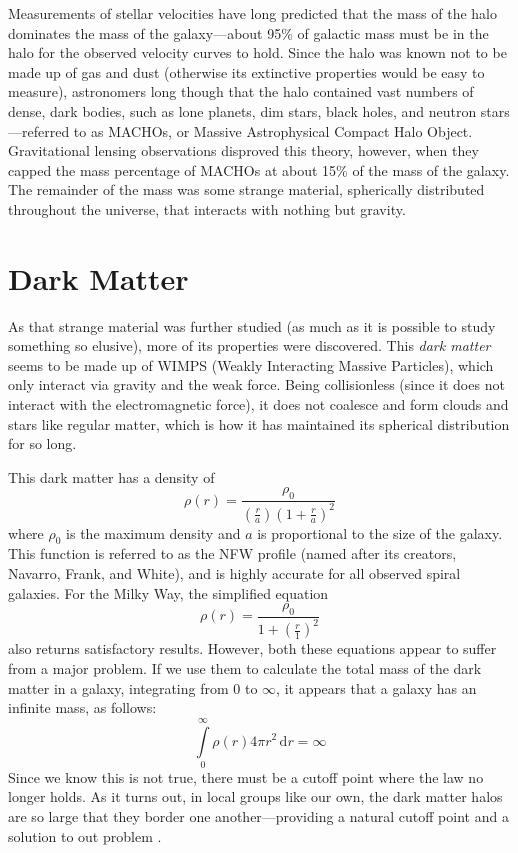 \documentclass[12pt,twoside]{reedthesis}
\begin{document}
Measurements of stellar velocities have long predicted that the mass of the halo dominates the mass of the galaxy---about 95\% of galactic mass must be in the halo for the observed velocity curves to hold. Since the halo was known not to be made up of gas and dust (otherwise its extinctive properties would be easy to measure), astronomers long though that the halo contained vast numbers of dense, dark bodies, such as lone planets, dim stars, black holes, and neutron stars---referred to as MACHOs, or Massive Astrophysical Compact Halo Object. Gravitational lensing observations disproved this theory, however, when they capped the mass percentage of MACHOs at about 15\% of the mass of the galaxy. The remainder of the mass was some strange material, spherically distributed throughout the universe, that interacts with nothing but gravity.

\section*{Dark Matter}
As that strange material was further studied (as much as it is possible to study something so elusive), more of its properties were discovered. This \emph{dark matter} seems to be made up of WIMPS (Weakly Interacting Massive Particles), which only interact via gravity and the weak force. Being collisionless (since it does not interact with the electromagnetic force), it does not coalesce and form clouds and stars like regular matter, which is how it has maintained its spherical distribution for so long.

This dark matter has a density of
\begin{equation}
    \rho(r) = \frac{\rho_0}{\left(\frac{r}{a}\right)\left(1+\frac{r}{a}\right)^2}
\end{equation}
where $\rho_0$ is the maximum density and $a$ is proportional to the size of the galaxy. This function is referred to as the NFW profile (named after its creators, Navarro, Frank, and White), and is highly accurate for all observed spiral galaxies. For the Milky Way, the simplified equation
\begin{equation}
    \rho(r) = \frac{\rho_0}{1+\left(\frac{r}{1}\right)^2}
\end{equation}
also returns satisfactory results. However, both these equations appear to suffer from a major problem. If we use them to calculate the total mass of the dark matter in a galaxy, integrating from 0 to $\infty$, it appears that a galaxy has an infinite mass, as follows:
\begin{equation}
    \int\limits_{0}^{\infty} \rho(r) 4 \pi r^2 \, \text{d}r = \infty
\end{equation}
Since we know this is not true, there must be a cutoff point where the law no longer holds. As it turns out, in local groups like our own, the dark matter halos are so large that they border one another---providing a natural cutoff point and a solution to out problem \citep[pp. 196]{galaxies-in-universe}.
\end{document}
